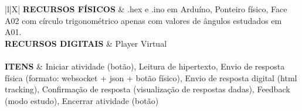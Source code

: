 \begin{xltabular}{\textwidth}{|l|X|}
	\textbf{RECURSOS FÍSICOS} & .hex e .ino em Arduíno, Ponteiro físico, Face A02 com círculo trigonométrico apenas com valores de ângulos estudados em A01.  \\ \hline
	\textbf{RECURSOS DIGITAIS} & Player Virtual \\ \hline		
	 \\ \hline
	\textbf{ITENS} & Iniciar atividade (botão), Leitura de hipertexto, Envio de resposta física (formato: websocket + json + botão físico), Envio de resposta digital (html tracking), Confirmação de resposta (visualização de respostas dadas), Feedback (modo estudo), Encerrar atividade (botão)  \\ \hline

\end{xltabular}

